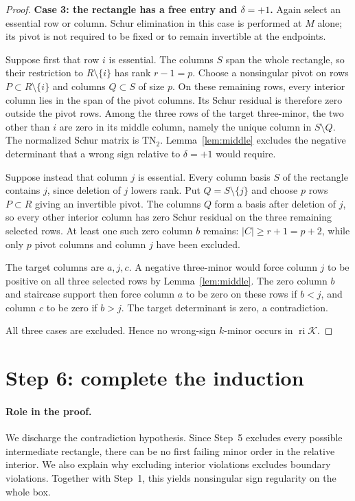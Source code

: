 \documentclass[10pt,a4paper]{article}
\theoremstyle{definition}
\theoremstyle{remark}
\numberwithin{equation}{section}
\newcommand{\K}{\mathcal K}
\DeclareMathOperator{\ri}{ri}
\begin{document}
\begin{proof}
\medskip\noindent
\textbf{Case 3: the rectangle has a free entry and $\delta=+1$.}
Again select an essential row or column. Schur elimination in
this case is performed at $M$ alone; its pivot is not required
to be fixed or to remain invertible at the endpoints.

Suppose first that row $i$ is essential. The columns $S$ span
the whole rectangle, so their restriction to $R\setminus\{i\}$
has rank $r-1=p$. Choose a nonsingular pivot on rows
$P\subset R\setminus\{i\}$ and columns $Q\subset S$ of
size $p$. On these remaining rows, every interior column lies
in the span of the pivot columns. Its Schur residual is
therefore zero outside the pivot rows. Among the three rows
of the target three-minor, the two other than $i$ are zero
in its middle column, namely the unique column in
$S\setminus Q$. The normalized Schur matrix is
$\mathrm{TN}_2$. Lemma~\ref{lem:middle} excludes the negative
determinant that a wrong sign relative to $\delta=+1$ would
require.

Suppose instead that column $j$ is essential. Every column
basis $S$ of the rectangle contains $j$, since deletion of
$j$ lowers rank. Put $Q=S\setminus\{j\}$ and choose $p$
rows $P\subset R$ giving an invertible pivot. The columns
$Q$ form a basis after deletion of $j$, so every other
interior column has zero Schur residual on the three
remaining selected rows. At least one such zero column
$b$ remains: $|C|\geq r+1=p+2$, while only $p$ pivot
columns and column $j$ have been excluded.

The target columns are $a,j,c$. A negative three-minor would
force column $j$ to be positive on all three selected rows by
Lemma~\ref{lem:middle}. The zero column $b$ and staircase
support then force column $a$ to be zero on these rows if
$b<j$, and column $c$ to be zero if $b>j$. The target
determinant is zero, a contradiction.

All three cases are excluded. Hence no wrong-sign $k$-minor
occurs in $\ri\K$.
\end{proof}

\section{Step 6: complete the induction}\label{sec:finish}

\paragraph{Role in the proof.}
We discharge the contradiction hypothesis. Since Step~5 excludes every
possible intermediate rectangle, there can be no first failing minor
order in the relative interior. We also explain why excluding interior
violations excludes boundary violations. Together with Step~1, this
yields nonsingular sign regularity on the whole box.
\end{document}
